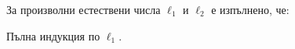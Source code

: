 \begin{proposition}\label{pr:unrestricted-grammar:general-step}
  За произволни естествени числа $\ell_1$ и $\ell_2$ е изпълнено, че:
  \begin{prooftree}
  \end{prooftree}  
\end{proposition}
\begin{hint}
  Пълна индукция по $\ell_1$.

\end{hint}

